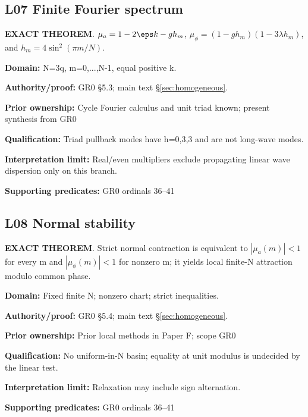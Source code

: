 \par\noindent\begin{minipage}{\linewidth}
\subsection*{L07 Finite Fourier spectrum}
\textbf{EXACT THEOREM}. \(\mu_a=1-2\eps k-gh_m\), \(\mu_\phi=(1-gh_m)(1-3\lambda h_m)\), and \(h_m=4\sin^2(\pi m/N)\).\par
\textbf{Domain:} N=3q, m=0,...,N-1, equal positive k.\par
\textbf{Authority/proof:} GR0 \S{}5.3; main text \S\ref{sec:homogeneous}.\par
\textbf{Prior ownership:} Cycle Fourier calculus and unit triad known; present synthesis from GR0\par
\textbf{Qualification:} Triad pullback modes have h=0,3,3 and are not long-wave modes.\par
\textbf{Interpretation limit:} Real/even multipliers exclude propagating linear wave dispersion only on this branch.\par
\textbf{Supporting predicates:} GR0 ordinals 36--41\par
\end{minipage}\par\medskip
\par\noindent\begin{minipage}{\linewidth}
\subsection*{L08 Normal stability}
\textbf{EXACT THEOREM}. Strict normal contraction is equivalent to \(|\mu_a(m)|<1\) for every m and \(|\mu_\phi(m)|<1\) for nonzero m; it yields local finite-N attraction modulo common phase.\par
\textbf{Domain:} Fixed finite N; nonzero chart; strict inequalities.\par
\textbf{Authority/proof:} GR0 \S{}5.4; main text \S\ref{sec:homogeneous}.\par
\textbf{Prior ownership:} Prior local methods in Paper F; scope GR0\par
\textbf{Qualification:} No uniform-in-N basin; equality at unit modulus is undecided by the linear test.\par
\textbf{Interpretation limit:} Relaxation may include sign alternation.\par
\textbf{Supporting predicates:} GR0 ordinals 36--41\par
\end{minipage}\par\medskip
